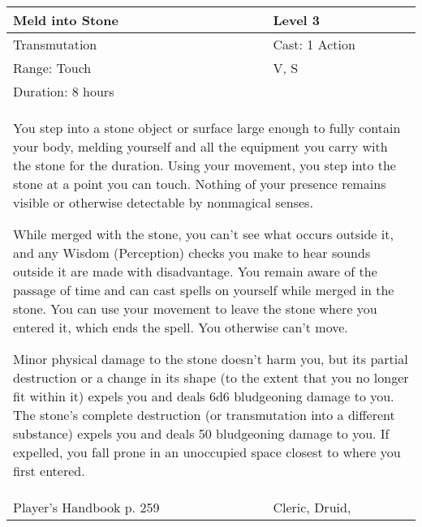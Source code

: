 \documentclass[11pt]{report}
\begin{document}
\begin{table}[H]
	\begin{tabular}{||p{6cm}|p{6cm}||}
		\hline\hline
		\bf{Meld into Stone} & Level 3\\ \hline
		Transmutation & Cast: 1 Action\\ \hline
		Range: Touch & V, S\\ \hline
		Duration: 8 hours & \\ \hline
		\multicolumn{2}{||p{12cm}||}{You step into a stone object or surface large enough to fully contain your body, melding yourself and all the equipment you carry with the stone for the duration.
Using your movement, you step into the stone at a point you can touch. Nothing of your presence remains visible or otherwise detectable by nonmagical senses.

While merged with the stone, you can’t see what occurs outside it, and any Wisdom (Perception) checks you make to hear sounds outside it are made with disadvantage. You remain aware of the passage of time and can cast spells on yourself while merged in the stone. You can use your movement to leave the stone where you entered it, which ends the spell. You otherwise can’t move.

Minor physical damage to the stone doesn’t harm you, but its partial destruction or a change in its shape (to the extent that you no longer fit within it) expels you and deals 6d6 bludgeoning damage to you. The stone’s complete destruction (or transmutation into a different substance) expels you and deals 50 bludgeoning damage to you. If expelled, you fall prone in an unoccupied space closest to where you first entered.}\\ \hline
Player's Handbook p. 259 & Cleric, Druid, \\ \hline\hline
	\end{tabular}
\end{table}
\end{document}
